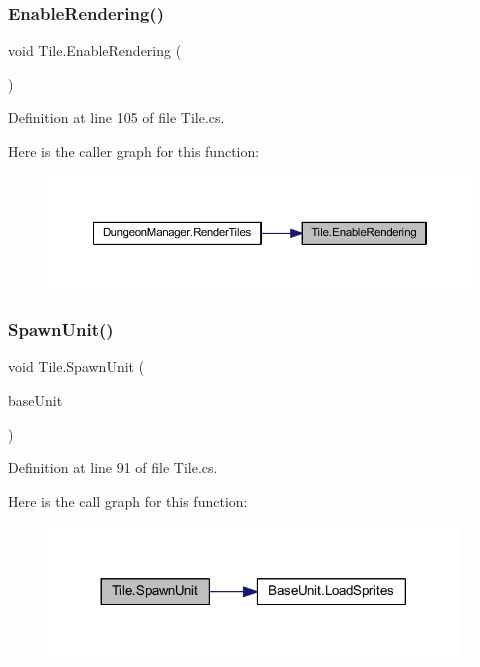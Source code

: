\subsubsection{\texorpdfstring{EnableRendering()}{EnableRendering()}}
{\footnotesize\ttfamily void Tile.\+Enable\+Rendering (\begin{DoxyParamCaption}{ }\end{DoxyParamCaption})}



Definition at line 105 of file Tile.\+cs.

Here is the caller graph for this function\+:
\nopagebreak
\begin{figure}[H]
\begin{center}
\leavevmode
\includegraphics[width=350pt]{class_tile_a1baa5fe3ab8f887e8985a85fba21210a_icgraph}
\end{center}
\end{figure}
\mbox{\label{class_tile_a183188c193a2ba5b62c8cdfc6d63471d}} 
\subsubsection{\texorpdfstring{SpawnUnit()}{SpawnUnit()}}
{\footnotesize\ttfamily void Tile.\+Spawn\+Unit (\begin{DoxyParamCaption}\item[{\mbox{\hyperlink{class_base_unit}{Base\+Unit}}}]{base\+Unit }\end{DoxyParamCaption})}



Definition at line 91 of file Tile.\+cs.

Here is the call graph for this function\+:
\nopagebreak
\begin{figure}[H]
\begin{center}
\leavevmode
\includegraphics[width=308pt]{class_tile_a183188c193a2ba5b62c8cdfc6d63471d_cgraph}
\end{center}
\end{figure}


